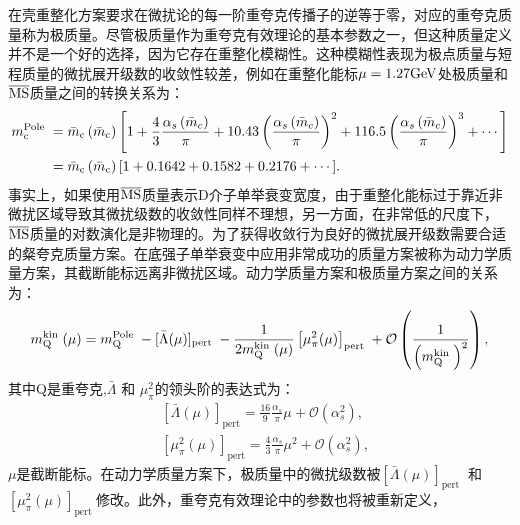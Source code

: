 在壳重整化方案要求在微扰论的每一阶重夸克传播子的逆等于零，对应的重夸克质量称为极质量。尽管极质量作为重夸克有效理论的基本参数之一，但这种质量定义并不是一个好的选择，因为它存在重整化模糊性。这种模糊性表现为极点质量与短程质量的微扰展开级数的收敛性较差，例如在重整化能标$\mu=1.27\mathrm{GeV}$处极质量和$\overline{\mathrm{MS}}$质量之间的转换关系为：
\begin{equation}
    \begin{aligned}
    m_{\mathrm{c}}^{\text {Pole }} & =\bar{m}_{\mathrm{c}}\left(\bar{m}_{\mathrm{c}}\right)\left[1+\frac{4}{3} \frac{\alpha_s\left(\bar{m}_c\right)}{\pi}+10.43\left(\frac{\alpha_s\left(\bar{m}_c\right)}{\pi}\right)^2+116.5\left(\frac{\alpha_s\left(\bar{m}_c\right)}{\pi}\right)^3+\cdots\right] \\
    & =\bar{m}_{\mathrm{c}}\left(\bar{m}_{\mathrm{c}}\right)[1+0.1642+0.1582+0.2176+\cdots].
    \end{aligned}
    \end{equation}
    事实上，如果使用$\overline{\mathrm{MS}}$质量表示D介子单举衰变宽度，由于重整化能标过于靠近非微扰区域导致其微扰级数的收敛性同样不理想，另一方面，在非常低的尺度下， 
    $\overline{\mathrm{MS}}$质量的对数演化是非物理的。为了获得收敛行为良好的微扰展开级数需要合适的粲夸克质量方案。在底强子单举衰变中应用非常成功的质量方案被称为动力学质量方案，其截断能标远离非微扰区域。动力学质量方案和极质量方案之间的关系为：
      \begin{equation}
        m_{\mathrm{Q}}^{\text {kin }}(\mu)=m_{\mathrm{Q}}^{\text {Pole }}-[\bar{\Lambda}(\mu)]_{\text {pert }}-\frac{1}{2 m_{\mathrm{Q}}^{\text {kin }}(\mu)}\left[\mu_\pi^2(\mu)\right]_{\text {pert }}+\mathcal{O}\left(\frac{1}{\left(m_{\mathrm{Q}}^{\text {kin }}\right)^2}\right),
        \end{equation}
    其中Q是重夸克,$\bar{\Lambda}$ 和 $\mu_\pi^2$的领头阶的表达式为：
        \begin{equation}
            \begin{aligned}
            & {[\bar{\Lambda}(\mu)]_{\mathrm{pert}}=\frac{16}{9} \frac{\alpha_s}{\pi} \mu+\mathcal{O}\left(\alpha_s^2\right)}, \\
            & {\left[\mu_\pi^2(\mu)\right]_{\mathrm{pert}}=\frac{4}{3} \frac{\alpha_s}{\pi} \mu^2+\mathcal{O}\left(\alpha_s^2\right)},
            \end{aligned}
            \end{equation}
    $\mu$是截断能标。在动力学质量方案下，极质量中的微扰级数被$[\bar{\Lambda}(\mu)]_{\text {pert }}$ 和 $\left[\mu_\pi^2(\mu)\right]_{\text {pert }}$修改。此外，重夸克有效理论中的参数也将被重新定义，
